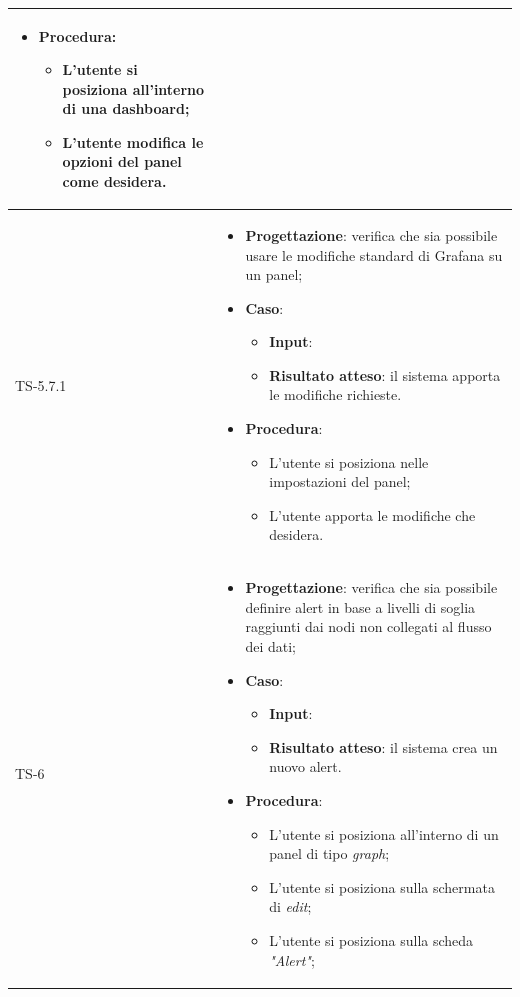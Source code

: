 \begin{longtable}{|C{2.5cm}|C{13cm}|}
\begin{itemize}
\begin{itemize}
	\end{itemize}
	\item \textbf{Procedura}:
	\begin{itemize}
		\item L'utente si posiziona all'interno di una dashboard;
		\item L'utente modifica le opzioni del panel come desidera.
	\end{itemize} 
\end{itemize}
	 \\
	\hline
	{TS-5.7.1} & 
\begin{itemize}
	\item \textbf{Progettazione}: verifica che sia possibile usare le
	modifiche standard di Grafana su un panel;
	\item \textbf{Caso}: 
	\begin{itemize}
		\item \textbf{Input}: 
		\item \textbf{Risultato atteso}: il sistema apporta le modifiche richieste.
	\end{itemize}
	\item \textbf{Procedura}:
	\begin{itemize}
		\item L'utente si posiziona nelle impostazioni del panel;
		\item L'utente apporta le modifiche che desidera.
	\end{itemize} 
\end{itemize}
	 \\
	\hline
	{TS-6} & 
\begin{itemize}
	\item \textbf{Progettazione}: verifica che sia  possibile definire alert in
	base a livelli di soglia raggiunti dai nodi non collegati al flusso dei dati;
	\item \textbf{Caso}: 
	\begin{itemize}
		\item \textbf{Input}: 
		\item \textbf{Risultato atteso}: il sistema crea un nuovo alert.
	\end{itemize}
	\item \textbf{Procedura}:
	\begin{itemize}
		\item L'utente si posiziona all'interno di un panel di tipo \emph{graph};
		\item L'utente si posiziona sulla schermata di \emph{edit};
		\item L'utente si posiziona sulla scheda \emph{"Alert"};

\end{itemize}
\end{itemize}
\end{longtable}
